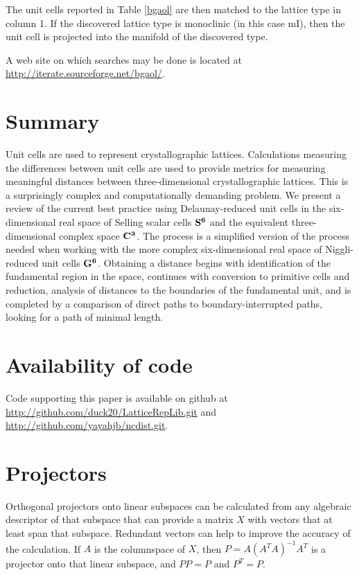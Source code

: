 \documentclass[preprint]{iucr}              %
\numberwithin{equation}{section}
\newcommand{\SVI}[0]{$\bf{S^{6}}$}
\newcommand{\GVI}[0]{$\bf{G^{6}}$}
\newcommand{\CIII}[0]{$\bf{C^{3}}$}
\begin{document}
The unit cells reported in Table \ref{bgaol} are then
matched to the lattice type in column 1. If the 
discovered lattice type is monoclinic (in this case mI),
then the unit cell is projected into the manifold of the 
discovered type.

A web site on which searches may be done  is located at \url{http://iterate.sourceforge.net/bgaol/}.

\section{Summary}

Unit cells are used to represent crystallographic lattices.
Calculations measuring the differences between unit
cells are used to provide metrics for measuring meaningful
distances between three-dimensional crystallographic
lattices.  This is a surprisingly complex and
computationally demanding problem.  We present a
review of the current best practice using 
Delaunay-reduced unit cells
in the six-dimensional real space of Selling
scalar cells \SVI{} and the equivalent three-dimensional complex space \CIII{}.
The process is a simplified version of the process
needed when working with the more complex
six-dimensional real space of Niggli-reduced unit
cells \GVI{}.  Obtaining a distance begins with identification of the fundamental region in the space, continues with
conversion to primitive cells and reduction, analysis of
distances to the boundaries of the fundamental unit,
and is completed by a comparison of direct paths to
boundary-interrupted paths, looking for a path of
minimal length. 

\appendix
\section{Availability of code}
    \label{code}

Code supporting this paper is available on github
at \url{http://github.com/duck20/LatticeRepLib.git}
and \url{http://github.com/yayahjb/ncdist.git}.

\section{Projectors}
	\label{projectors}
	
Orthogonal projectors onto linear subspaces can be calculated from 
any algebraic descriptor of that subspace that can provide a matrix $X$ with vectors that at least span that subspace.  Redundant vectors can help to improve the accuracy of the calculation.  If $A$ is the columnspace of $X$, then
$P=A(A^TA)^{-1}A^T$ is a projector onto that linear subspace,
and $PP=P$ and $P^T=P$.
\end{document}
